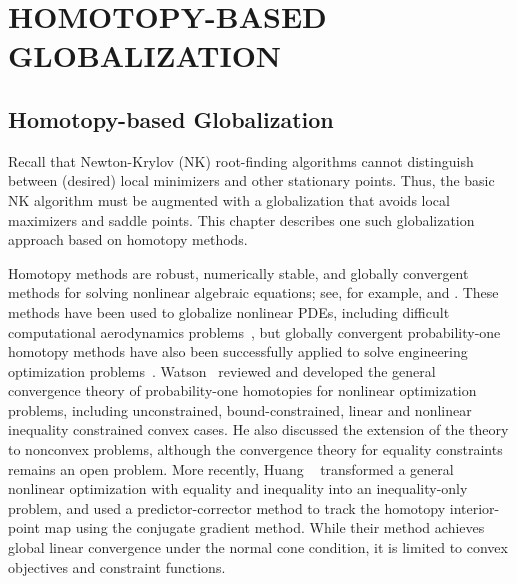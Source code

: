  
\chapter{HOMOTOPY-BASED GLOBALIZATION}\label{chap:homotopy}


\section{Homotopy-based Globalization}\label{sec:homotopy}
Recall that Newton-Krylov (NK) root-finding algorithms cannot distinguish between (desired) local minimizers and other stationary points.  Thus, the basic NK algorithm must be augmented with a globalization that avoids local maximizers and saddle points.  This chapter describes one such globalization approach based on homotopy methods. 

Homotopy methods are robust, numerically stable, and globally convergent methods
for solving nonlinear algebraic equations; see, for example,
\cite{allgower_georg_1993} and \cite{Watson_1989}.  
These methods have been used to globalize nonlinear PDEs, including 
difficult computational aerodynamics
problems~\cite{hicken:cfd2009, hicken:cfd2011b, Brown_2016}, but globally
convergent probability-one homotopy methods have also been successfully applied
to solve engineering optimization problems~\cite{WATSON1989289}.  Watson~\cite{Watson_2001} reviewed
and developed the general convergence theory of probability-one homotopies for nonlinear optimization
problems, including unconstrained, bound-constrained, linear and nonlinear
inequality constrained convex cases.  He also discussed the extension of the
theory to nonconvex problems, although the convergence theory for equality
constraints remains an open problem.  More recently, Huang
\etal~\cite{huang_2012pc} transformed a general nonlinear optimization with
equality and inequality into an inequality-only problem, and used a
predictor-corrector method to track the homotopy interior-point map using the
conjugate gradient method. While their method achieves global linear convergence
under the normal cone condition, it is limited to convex objectives and
constraint functions.

